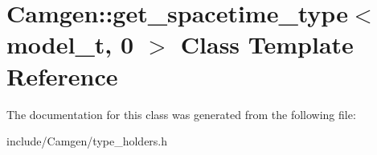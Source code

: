 \hypertarget{a00250}{\section{Camgen\-:\-:get\-\_\-spacetime\-\_\-type$<$ model\-\_\-t, 0 $>$ Class Template Reference}
\label{a00250}
}


The documentation for this class was generated from the following file\-:\begin{DoxyCompactItemize}
\item 
include/\-Camgen/type\-\_\-holders.\-h\end{DoxyCompactItemize}
